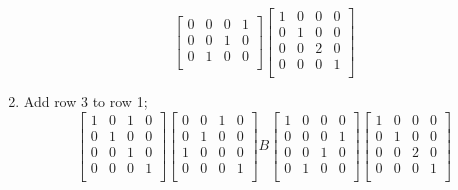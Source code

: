 \documentclass[12pt]{article}
\makeatletter
\theoremstyle{homework}
\newenvironment{exercise}[1]
{\def\@currentlabel{#1}\exercisecore}
{\endexercisecore}
\makeatother
\begin{document}
\begin{exercise}{4}
\begin{enumerate}
\begin{equation*}
\begin{bmatrix}
                0 & 0 & 0 & 1\\
                0 & 0 & 1 & 0\\
                0 & 1 & 0 & 0\\
            \end{bmatrix}
            \begin{bmatrix}
                1 & 0 & 0 & 0\\
                0 & 1 & 0 & 0\\
                0 & 0 & 2 & 0\\
                0 & 0 & 0 & 1\\
            \end{bmatrix}
        \end{equation*}
        \item Add row 3 to row 1;
        \begin{equation*}
            \begin{bmatrix}
                1 & 0 & 1 & 0\\
                0 & 1 & 0 & 0\\
                0 & 0 & 1 & 0\\
                0 & 0 & 0 & 1\\
            \end{bmatrix}
            \begin{bmatrix}
                0 & 0 & 1 & 0\\
                0 & 1 & 0 & 0\\
                1 & 0 & 0 & 0\\
                0 & 0 & 0 & 1\\
            \end{bmatrix}
            B
            \begin{bmatrix}
                1 & 0 & 0 & 0\\
                0 & 0 & 0 & 1\\
                0 & 0 & 1 & 0\\
                0 & 1 & 0 & 0\\
            \end{bmatrix}
            \begin{bmatrix}
                1 & 0 & 0 & 0\\
                0 & 1 & 0 & 0\\
                0 & 0 & 2 & 0\\
                0 & 0 & 0 & 1\\
            \end{bmatrix}

\end{equation*}
\end{enumerate}
\end{exercise}
\end{document}

